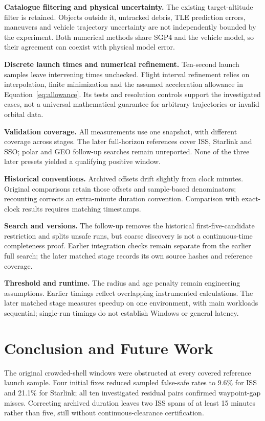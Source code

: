 \documentclass[11pt,a4paper]{article}
\begin{document}
\textbf{Catalogue filtering and physical uncertainty.} The existing
target-altitude filter is retained. Objects outside it, untracked debris,
TLE prediction errors, maneuvers and vehicle trajectory uncertainty are
not independently bounded by the experiment. Both numerical methods
share SGP4 and the vehicle model, so their agreement can coexist with
physical model error.

\textbf{Discrete launch times and numerical refinement.} Ten-second
launch samples leave intervening times unchecked. Flight interval
refinement relies on interpolation, finite minimization and the assumed
acceleration allowance in Equation~\ref{eq:allowance}. Its tests and
resolution controls support the investigated cases, not a universal
mathematical guarantee for arbitrary trajectories or invalid orbital data.

\textbf{Validation coverage.} All measurements use one snapshot, with
different coverage across stages. The later full-horizon references cover
ISS, Starlink and SSO; polar and GEO follow-up searches remain unreported.
None of the three later presets
yielded a qualifying positive window.

\textbf{Historical conventions.} Archived offsets drift slightly from
clock minutes. Original comparisons retain those offsets and sample-based
denominators; recounting corrects an extra-minute duration convention.
Comparison with exact-clock results requires matching timestamps.

\textbf{Search and versions.} The follow-up removes the historical
first-five-candidate restriction and splits unsafe runs, but coarse
discovery is not a continuous-time completeness proof. Earlier integration
checks remain separate from the earlier full search;
the later matched stage records its own source hashes and reference coverage.

\textbf{Threshold and runtime.} The radius and age penalty remain
engineering assumptions. Earlier timings reflect overlapping instrumented
calculations. The later matched stage measures speedup on one environment, with main workloads
sequential; single-run timings do not establish Windows or general latency.

\section{Conclusion and Future Work}
\label{sec:conclusion}

The original crowded-shell windows were obstructed at every covered
reference launch sample. Four initial fixes reduced sampled false-safe
rates to 9.6\% for ISS and 21.1\% for Starlink; all ten investigated
residual pairs confirmed waypoint-gap misses. Correcting archived duration
leaves two ISS spans of at least 15 minutes rather than five, still
without continuous-clearance certification.
\end{document}
